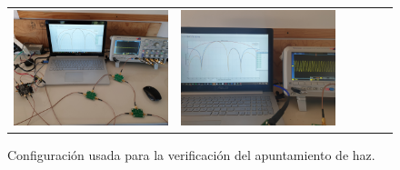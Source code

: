 \documentclass{article}
\newenvironment{standalone}{\begin{preview}}{\end{preview}}
\begin{document}
\begin{standalone}
\begin{figure}[!htbp]
    \begin{tabular}{lccccc}
      \includegraphics[width=\linewidth/2]{../images/setup-apuntamiento-1.jpg}&
      \includegraphics[width=\linewidth/2]{../images/setup-apuntamiento-2.jpg}\\
    \end{tabular}

    \caption{Configuración usada para la verificación del apuntamiento de haz.}
    \label{fig:setup-apuntamiento}
  \end{figure}

\end{standalone}
\end{document}

